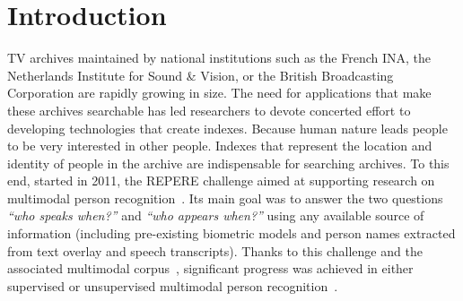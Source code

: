 \section{Introduction}

TV archives maintained by national institutions such as the French INA, the Netherlands Institute for Sound \& Vision, or the British Broadcasting Corporation are rapidly growing in size. The need for applications that make these archives searchable has led researchers to devote concerted effort to developing technologies that create indexes.
%
Because human nature leads people to be very interested in other people.
Indexes that represent the location and identity of people in the archive are indispensable for searching archives.
%
To this end, started in 2011, the REPERE challenge aimed at supporting research on multimodal person recognition~\cite{BERNARD--SLAM--2013, KAHN--CBMI--2012}. Its main goal was to answer the two questions \emph{``who speaks when?''} and \emph{``who appears when?''} using any available source of information (including pre-existing biometric models and person names extracted from text overlay and speech transcripts). 
%
Thanks to this challenge and the associated multimodal corpus~\cite{GIRAUDEL--LREC--2012}, significant progress was achieved in either supervised or unsupervised multimodal person recognition~\cite{BECHET--INTERSPEECH--2014, BREDIN--ODYSSEY--2014, BREDIN--IJMIR--2014, GAY--CBMI--2014, POIGNANT--ASLP--2015, POIGNANT--INTERSPEECH--2012, POIGNANT--MTAP--2015, ROUVIER--CBMI--2014}.

